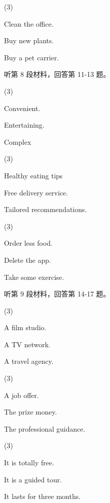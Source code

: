 \documentclass{英语试卷}
\begin{document}
\begin{choices}(3)
  \item Clean the office.
  \item Buy new plants.
  \item Buy a pet carrier.
\end{choices}
\par 听第 8 段材料，回答第 11-13 题。\par
{}
\begin{choices}(3)
  \item Convenient.
  \item Entertaining.
  \item Complex
\end{choices}
\begin{choices}(3)
  \item Healthy eating tips
  \item Free delivery service.
  \item Tailored recommendations.
\end{choices}
\begin{choices}(3)
  \item Order less food.
  \item Delete the app.
  \item Take some exercise.
\end{choices}
\par 听第 9 段材料，回答第 14-17 题。\par
{}
\begin{choices}(3)
  \item A film studio.
  \item A TV network.
  \item A travel agency.
\end{choices}
\begin{choices}(3)
  \item A job offer.
  \item The prize money.
  \item The professional guidance.
\end{choices}
\begin{choices}(3)
  \item It is totally free.
  \item It is a guided tour.
  \item It lasts for three months.
\end{choices}
\end{document}
